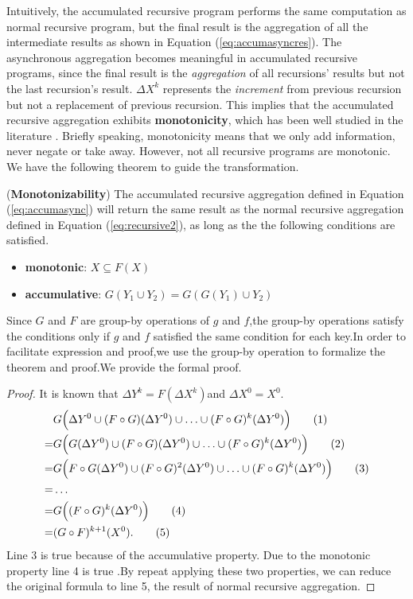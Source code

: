Intuitively, the accumulated recursive program performs the same computation as normal recursive program, but the final result is the aggregation of all the intermediate results as shown in Equation (\ref{eq:accumasyncres}). The asynchronous aggregation becomes meaningful in accumulated recursive programs, since the final result is the \emph{aggregation} of all recursions' results but not the last recursion's result. $\Delta X^{k}$ represents the \emph{increment} from previous recursion but not a replacement of previous recursion. This implies that the accumulated recursive aggregation exhibits \textbf{monotonicity}, which has been well studied in the literature \cite{Hellerstein:2010:DIE:1860702.1860704,calm,Lam:2013:SDE:2510649.2511289,Wang:2015:AFR:2824032.2824052}. Briefly speaking, monotonicity means that we only add information, never negate or take away. However, not all recursive programs are monotonic. We have the following theorem to guide the transformation.
\begin{theorem}
	\label{th:monotone}
	(\textbf{Monotonizability}) The accumulated recursive aggregation defined in Equation (\ref{eq:accumasync}) will return the same result as the normal recursive aggregation defined in Equation (\ref{eq:recursive2}), as long as the the following conditions are satisfied.
	\begin{itemize}
		\item \textbf{monotonic}: $X\subseteq F(X)$
		\item \textbf{accumulative}: $G(Y_1\cup Y_2)=G(G(Y_1)\cup Y_2)$
	\end{itemize}
	
\end{theorem}
Since $G$ and $F$ are group-by operations of $g$ and $f$,the group-by operations satisfy the conditions only if $g$ and $f$ satisfied the same condition for each key.In order to facilitate expression and proof,we use the group-by operation to formalize the theorem and proof.We provide the formal proof.
\begin{proof}
	\label{sec:app:proof:monotonic}
	It is known that $\Delta Y^k=F(\Delta X^k)$and $\Delta X^0=X^0$.
	\begin{align}
	&G\Big(\Delta Y^0\cup (F\circ G)(\Delta Y^0)\cup\ldots\cup (F\circ G)^k(\Delta Y^0)\Big)\tag{1} \\
	=&G\Big(G(\Delta Y^0)\cup (F\circ G)(\Delta Y^0)\cup \ldots \cup (F\circ G)^k( \Delta Y^0)\Big)\tag{2}\\
	=&G\Big(F\circ G(\Delta Y^0)\cup (F\circ G)^2(\Delta Y^0)\cup \ldots \cup (F\circ G)^k(\Delta Y^0)\Big) \tag{3}\\
	=& \ldots \notag \\
	=&G\Big((F\circ G)^k(\Delta Y^0)\Big)\tag{4}\\
	=&(G \circ F)^{k+1}(X^0).\tag{5}
	\end{align}
	Line 3 is true because of the accumulative property. Due to the monotonic property line 4 is true .By repeat applying these two properties, we can reduce the original formula to line 5, the result of normal recursive aggregation. 
\end{proof}

